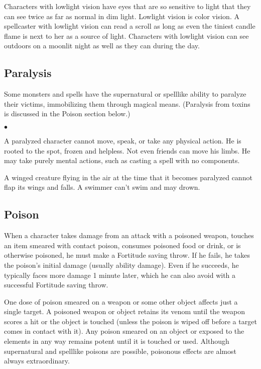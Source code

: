 Characters with low\textendash light vision have eyes that are so sensitive to light that they can see twice as far as normal in dim light. Low\textendash light vision is color vision. A spellcaster with low\textendash light vision can read a scroll as long as even the tiniest candle flame is next to her as a source of light. Characters with low\textendash light vision can see outdoors on a moonlit night as well as they can during the day.

\subsection{Paralysis}

Some monsters and spells have the supernatural or spell\textendash like ability to paralyze their victims, immobilizing them through magical means. (Paralysis from toxins is discussed in the Poison section below.)

\begin{list}{$\bullet$}{\itemspace}
	\item A paralyzed character cannot move, speak, or take any physical action. He is rooted to the spot, frozen and helpless. Not even friends can move his limbs. He may take purely mental actions, such as casting a spell with no components.
	\item A winged creature flying in the air at the time that it becomes paralyzed cannot flap its wings and falls. A swimmer can't swim and may drown.
\end{list}

\subsection{Poison}

When a character takes damage from an attack with a poisoned weapon, touches an item smeared with contact poison, consumes poisoned food or drink, or is otherwise poisoned, he must make a Fortitude saving throw. If he fails, he takes the poison's initial damage (usually ability damage). Even if he succeeds, he typically faces more damage 1 minute later, which he can also avoid with a successful Fortitude saving throw.

One dose of poison smeared on a weapon or some other object affects just a single target. A poisoned weapon or object retains its venom until the weapon scores a hit or the object is touched (unless the poison is wiped off before a target comes in contact with it). Any poison smeared on an object or exposed to the elements in any way remains potent until it is touched or used.
Although supernatural and spell\textendash like poisons are possible, poisonous effects are almost always extraordinary.

